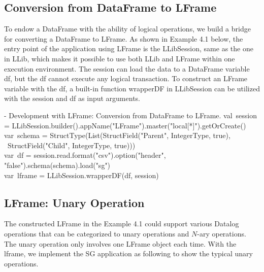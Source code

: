 

\subsection{Conversion from DataFrame to LFrame}
\label{sec:utility}
To endow a DataFrame with the ability of logical operations, we build a bridge for converting a DataFrame to LFrame. 
As shown in Example 4.1 below, the entry point of the application using LFrame is the LLibSession, same as the one in LLib, which makes it possible to use both LLib and LFrame within one execution environment. 
The session can  load the data to a DataFrame variable df, but the df cannot execute any logical transaction. To construct an LFrame variable with the  df, a built-in function wrapperDF in LLibSession can be utilized with the session and df as input arguments. 

\vspace{0.5em}
 - Development with LFrame:  Conversion from DataFrame to LFrame.
\bldl
val\ session = LLibSession.builder().appName("LFrame").master("local[*]").getOrCreate() \\
var\ schema = StructType(List(StructField("Parent", IntegerType, true),\\ \ StructField("Child", IntegerType, true)))\\
var\ df = session.read.format("csv").option("header", "false").schema(schema).load("sg")\\
var\ lframe = LLibSession.wrapperDF(df, session)
\eldl

\subsection{LFrame: Unary Operation}
\label{sec:unary}
The constructed LFrame in the Example 4.1 could support various Datalog operations that can be categorized to unary operations and $N$-ary operations.
The unary operation only involves one LFrame object each time. With the lframe, we implement the SG application as following to show the typical unary operations. 


